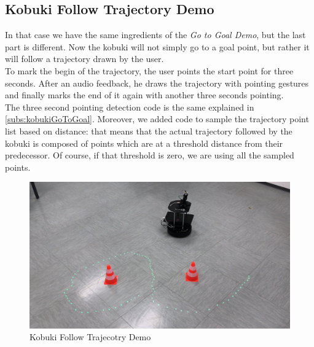 \subsection{Kobuki Follow Trajectory Demo}
In that case we have the same ingredients of the \emph{Go to Goal Demo}, but the last part is different. Now the kobuki will not simply go to a goal point, but rather it will follow a trajectory drawn by the user.\\
To mark the begin of the trajectory, the user points the start point for three seconds. After an audio feedback, he draws the trajectory with pointing gestures and finally marks the end of it again with another three seconds pointing.\\
The three second pointing detection code is the same explained in \ref{subs:kobukiGoToGoal}. Moreover, we added code to sample the trajectory point list based on distance: that means that the actual trajectory followed by the kobuki is composed of points which are at a threshold distance from their predecessor. Of course, if that threshold is zero, we are using all the sampled points.\\

\begin{figure}
	\centering
	\includegraphics[width=\textwidth]{img/followTrajectoryDemo.png}%
	\caption{Kobuki Follow Trajecotry Demo}
	\label{fig:followTrajectoryDemo}
\end{figure}

